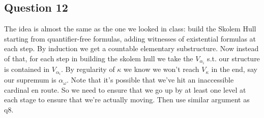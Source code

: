 \documentclass[a4paper]{article}
\begin{document}
\subsection{Question 12}
The idea is almost the same as the one we looked in class: build the Skolem Hull starting from quantifier-free formulas, adding witnesses of existential formulas at each step. By induction we get a countable elementary substructure. Now instead of that, for each step in building the skolem hull we take the $V_{\alpha_i}$ s.t. our structure is contained in $V_{\alpha_i}$. By regularity of $\kappa$ we know we won't reach $V_\kappa$ in the end, say our supremum is $\alpha_\omega$. Note that it's possible that we've hit an inaccessible cardinal en route. So we need to ensure that we go up by at least one level at each stage to ensure that we're actually moving. Then use similar argument as q8.
\end{document}
